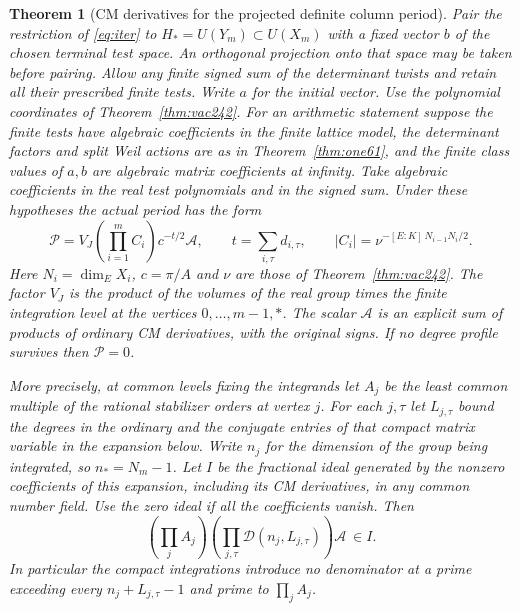 \documentclass[a4paper,11pt]{article}
\newtheorem{theorem}[proposition]{Theorem}
\theoremstyle{definition}
\theoremstyle{remark}
\numberwithin{equation}{section}
\begin{document}
\begin{theorem}[CM derivatives for the projected definite column period]
\label{thm:column242}
Pair the restriction of \eqref{eq:iter} to
\(H_*=U(Y_m)\subset U(X_m)\) with a fixed vector \(b\) of the
chosen terminal test space. An orthogonal projection onto that
space may be taken before pairing. Allow any finite signed sum
of the determinant twists and retain all their prescribed finite
tests. Write \(a\) for the initial vector. Use the polynomial
coordinates of Theorem~\ref{thm:vac242}. For an arithmetic
statement suppose the finite tests have algebraic coefficients
in the finite lattice model, the determinant factors and split
Weil actions are as in Theorem~\ref{thm:one61}, and the finite
class values of \(a,b\) are algebraic matrix coefficients at
infinity. Take algebraic coefficients in the real test polynomials
and in the signed sum. Under these hypotheses the actual period
has the form
\[
 \mathcal P=V_J\left(\prod_{i=1}^m C_i\right)c^{-t/2}\mathcal A,
 \qquad
 t=\sum_{i,\tau} d_{i,\tau},\qquad
 |C_i|=\nu^{-[E:K]\,N_{i-1}N_i/2}.
\]
Here \(N_i=\dim_E X_i\), \(c=\pi/A\) and \(\nu\) are those of
Theorem~\ref{thm:vac242}. The factor \(V_J\) is the product of the volumes
of the real group times the finite integration level at the
vertices \(0,\ldots,m-1,*\). The scalar \(\mathcal A\) is an
explicit sum of products of ordinary CM derivatives, with the
original signs. If no degree profile survives then
\(\mathcal P=0\).

More precisely, at common levels fixing the integrands let
\(A_j\) be the least common multiple of the rational stabilizer
orders at vertex \(j\). For each \(j,\tau\) let \(L_{j,\tau}\)
bound the degrees in the ordinary and the conjugate entries
of that compact matrix variable in the expansion below.
Write \(n_j\) for the dimension of the group being integrated,
so \(n_*=N_m-1\). Let \(I\) be the fractional ideal generated
by the nonzero coefficients of this expansion, including its
CM derivatives, in any common number field. Use the zero ideal
if all the coefficients vanish. Then
\[
 \left(\prod_j A_j\right)
 \left(\prod_{j,\tau}\mathcal D(n_j,L_{j,\tau})\right)
                  \mathcal A\ \in I .
\]
In particular the compact integrations introduce no denominator at
a prime exceeding every \(n_j+L_{j,\tau}-1\) and prime to
\(\prod_j A_j\).
\end{theorem}
\end{document}
